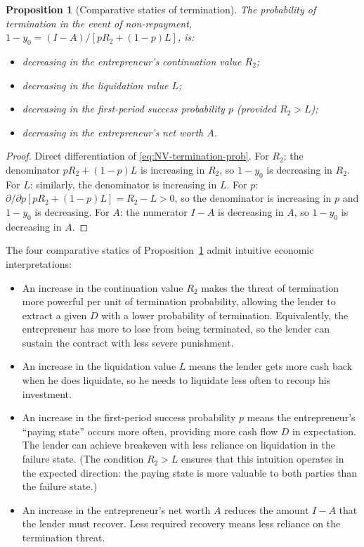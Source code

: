 \documentclass[11pt,a4paper,oneside]{book}
\theoremstyle{plain}
\newtheorem{proposition}[theorem]{Proposition}
\theoremstyle{definition}
\theoremstyle{remark}
\numberwithin{equation}{chapter}
\begin{document}
\begin{proposition}[Comparative statics of termination]\label{prop:NV-comp-statics}
The probability of termination in the event of non-repayment, $1 - y_0 = (I - A)/[p R_2 + (1 - p) L]$, is:
\begin{itemize}
  \item \emph{decreasing} in the entrepreneur's continuation value $R_2$;
  \item \emph{decreasing} in the liquidation value $L$;
  \item \emph{decreasing} in the first-period success probability $p$ (provided $R_2 > L$);
  \item \emph{decreasing} in the entrepreneur's net worth $A$.
\end{itemize}
\end{proposition}

\begin{proof}
Direct differentiation of \eqref{eq:NV-termination-prob}.
For $R_2$: the denominator $p R_2 + (1 - p) L$ is increasing in $R_2$, so $1 - y_0$ is decreasing in $R_2$.
For $L$: similarly, the denominator is increasing in $L$.
For $p$: $\partial/\partial p [p R_2 + (1 - p) L] = R_2 - L > 0$, so the denominator is increasing in $p$ and $1 - y_0$ is decreasing.
For $A$: the numerator $I - A$ is decreasing in $A$, so $1 - y_0$ is decreasing in $A$.
\end{proof}

The four comparative statics of Proposition~\ref{prop:NV-comp-statics} admit intuitive economic interpretations:

\begin{itemize}
  \item An increase in the continuation value $R_2$ makes the threat of termination more powerful per unit of termination probability, allowing the lender to extract a given $D$ with a lower probability of termination.
  Equivalently, the entrepreneur has more to lose from being terminated, so the lender can sustain the contract with less severe punishment.
  \item An increase in the liquidation value $L$ means the lender gets more cash back when he does liquidate, so he needs to liquidate less often to recoup his investment.
  \item An increase in the first-period success probability $p$ means the entrepreneur's ``paying state'' occurs more often, providing more cash flow $D$ in expectation.
  The lender can achieve breakeven with less reliance on liquidation in the failure state.
  (The condition $R_2 > L$ ensures that this intuition operates in the expected direction: the paying state is more valuable to both parties than the failure state.)
  \item An increase in the entrepreneur's net worth $A$ reduces the amount $I - A$ that the lender must recover.
  Less required recovery means less reliance on the termination threat.
\end{itemize}
\end{document}

